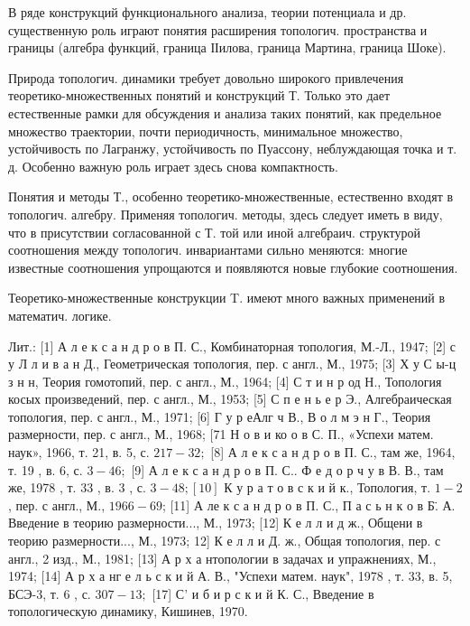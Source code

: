 \documentclass[10pt]{article}
\begin{document}
В ряде конструкций функционального анализа, теории потенциала и др. существенную роль играют понятия расширения топологич. пространства и границы (алгебра функций, граница ІІилова, граница Мартина, граница Шоке).



Природа топологич. динамики требует довольно широкого привлечения теоретико-множественных понятий и конструкций Т. Только это дает естественные рамки для обсуждения и анализа таких понятий, как предельное множество траектории, почти периодичность, минимальное множество, устойчивость по Лагранжу, устойчивость по Пуассону, неблуждающая точка и т. д. Особенно важную роль играет здесь снова компактность.



Понятия и методы Т., особенно теоретико-множественные, естественно входят в топологич. алгебру. Применяя топологич. методы, здесь следует иметь в виду, что в присутствии согласованной с Т. той или иной алгебраич. структурой соотношения между топологич. инвариантами сильно меняются: многие известные соотношения упрощаются и появляются новые глубокие соотношения.



Теоретико-множественные конструкции T. имеют много важных применений в математич. логике.



Лит.: [1] А л е к с а н д р о в П. С., Комбинаторная топология, М.-Л., 1947; [2] с у Л л и в а н Д., Геометрическая топология, пер. с англ., М., 1975; [3] Х у С ы-ц з н н, Теория гомотопий, пер. с англ., М., 1964; [4] С т и н р од Н., Топология косых произведений, пер. с англ., М., 1953; [5] С п е н ь е р Э., Алгебраическая топология, пер. с англ., М., 1971; [6] Г у р еАлг ч В., В о л м э н Г., Теория размерности, пер. с англ., М., 1968; [71 Н о в и ко о в С. П., «Успехи матем. наук», 1966, т. 21, в. 5, с. $217-32 ;$ [8] А л е к с а н д р о в П. С., там же, 1964, т. 19 , в. 6, с. $3-46 ;$ [9] А л е к с а н д р о в П. С.. Ф е д о р ч у в В. В., там же, 1978 , т. 33 , в. 3 , с. $3-48 ;[10]$ К у р а т о в с к и й к., Топология, т. $1-2$, пер. с англ., М., $1966-69$; [11] А ле к с а н д р о в П. С., П а с ь н к о в Б̈. А. Введение в теорию размерности..., М., 1973; [12] К е л л и д ж., Общени в теорию размерности..., М., 1973; 12] К е л л и Д. ж., Общая топология, пер. с англ., 2 изд., М., 1981; [13] А р х а нтопологии в задачах и упражнениях, М., 1974; [14] А р х а нг е л ь с к и й А. В., "Успехи матем. наук", 1978 , т. 33, в. 5, БСЭ-3, т. 6 , с. $307-13 ;$ [17] С' и б и р с к и й К. С., Введение в топологическую динамику, Кишинев, 1970.
\end{document}
